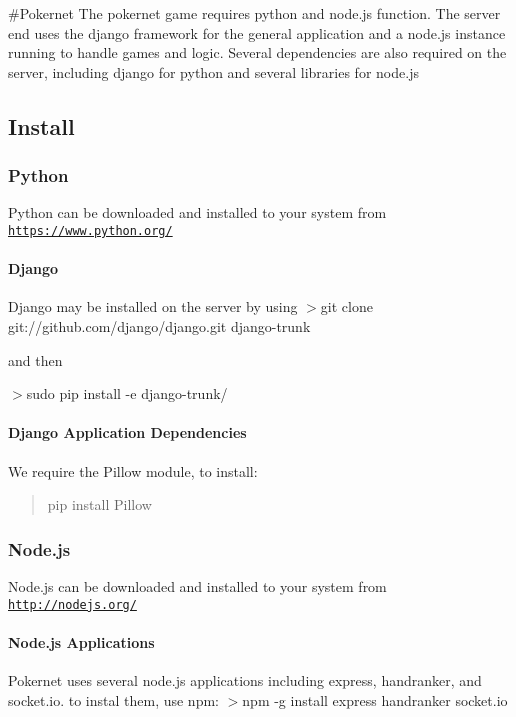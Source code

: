 \#\+Pokernet The pokernet game requires python and node.\+js function. The server end uses the django framework for the general application and a node.\+js instance running to handle games and logic. Several dependencies are also required on the server, including django for python and several libraries for node.\+js

\subsection*{Install}

\subsubsection*{Python}

Python can be downloaded and installed to your system from \href{https://www.python.org/}{\tt https\+://www.\+python.\+org/}

\paragraph*{Django}

Django may be installed on the server by using $>$git clone git\+://github.com/django/django.\+git django-\/trunk

and then

$>$sudo pip install -\/e django-\/trunk/

\paragraph*{Django Application Dependencies}

We require the Pillow module, to install\+: \begin{quote}
pip install Pillow \end{quote}


\subsubsection*{Node.\+js}

Node.\+js can be downloaded and installed to your system from \href{http://nodejs.org/}{\tt http\+://nodejs.\+org/}

\paragraph*{Node.\+js Applications}

Pokernet uses several node.\+js applications including express, handranker, and socket.\+io. to instal them, use npm\+: $>$npm -\/g install express handranker socket.\+io

